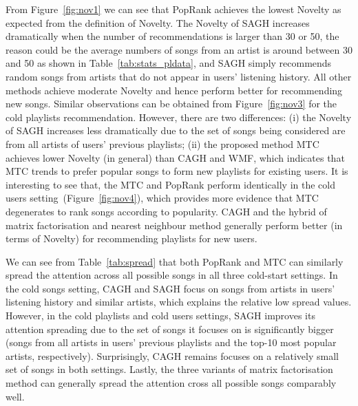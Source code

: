 From Figure~\ref{fig:nov1} we can see that PopRank achieves the lowest Novelty as expected from the definition of Novelty.
The Novelty of SAGH increases dramatically when the number of recommendations is larger than 30 or 50, the reason could be the average 
numbers of songs from an artist is around between 30 and 50 as shown in Table~\ref{tab:stats_pldata}, and SAGH simply recommends random
songs from artists that do not appear in users' listening history.
All other methods achieve moderate Novelty and hence perform better for recommending new songs.
Similar observations can be obtained from Figure~\ref{fig:nov3} for the cold playlists recommendation.
However, there are two differences: (i) the Novelty of SAGH increases less dramatically due to the set of songs being considered are from
all artists of users' previous playlists; (ii) the proposed method MTC achieves lower Novelty (in general) than CAGH and WMF, which indicates
that MTC trends to prefer popular songs to form new playlists for existing users.
It is interesting to see that, the MTC and PopRank perform identically in the cold users setting~(Figure~\ref{fig:nov4}),
which provides more evidence that MTC degenerates to rank songs according to popularity.
CAGH and the hybrid of matrix factorisation and nearest neighbour method generally perform better (in terms of Novelty) for recommending 
playlists for new users.

We can see from Table~\ref{tab:spread} that both PopRank and MTC can similarly spread the attention across all possible songs in all three
cold-start settings. 
In the cold songs setting, CAGH and SAGH focus on songs from artists in users' listening history and similar artists, which explains 
the relative low spread values.
However, in the cold playlists and cold users settings, SAGH improves its attention spreading due to the set of songs it focuses on 
is significantly bigger (\ie songs from all artists in users' previous playlists and the top-10 most popular artists, respectively).
Surprisingly, CAGH remains focuses on a relatively small set of songs in both settings.
Lastly, the three variants of matrix factorisation method can generally spread the attention cross all possible songs comparably well.

